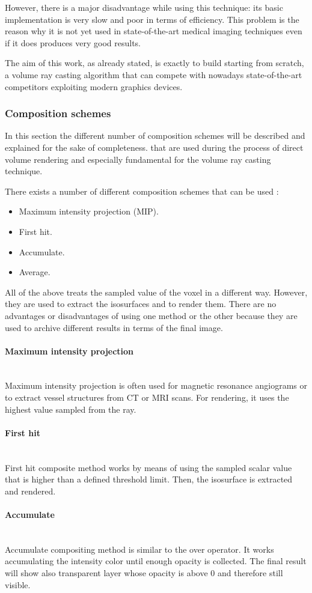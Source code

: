 \documentclass[12pt,a4paper]{extarticle}
\newcommand{\linespace}{\vspace{0pt}}
\newcommand{\myparagraph}[1]{\paragraph{#1}\mbox{}\\}
\begin{document}
However, there is a major disadvantage while using this technique: its basic implementation is very slow and poor in terms of efficiency. This problem is the reason why it is not yet used in state-of-the-art medical imaging techniques even if it does produces very good results.
\linespace

The aim of this work, as already stated, is exactly to build starting from scratch, a volume ray casting algorithm that can compete with nowadays state-of-the-art competitors exploiting modern graphics devices.

\subsubsection{Composition schemes}
In this section the different number of composition schemes will be described and explained for the sake of completeness. that are used during the process of direct volume rendering and especially fundamental for the volume ray casting technique.

There exists a number of different composition schemes that can be used \cite{KAUFMAN2005127}:
\begin{itemize}
\item Maximum intensity projection (MIP).
\item First hit.
\item Accumulate.
\item Average.
\end{itemize}  
All of the above treats the sampled value of the voxel in a different way. However, they are used to extract the isosurfaces and to render them. There are no advantages or disadvantages of using one method or the other because they are used to archive different results in terms of the final image.

\myparagraph{Maximum intensity projection} Maximum intensity projection is often used for magnetic resonance angiograms or to extract vessel structures from CT or MRI scans. For rendering, it uses the highest value sampled from the ray.

\myparagraph{First hit} First hit composite method works by means of using the sampled scalar value that is higher than a defined threshold limit. Then, the isosurface is extracted and rendered.

\myparagraph{Accumulate} Accumulate compositing method is similar to the over operator. It works accumulating the intensity color until enough opacity is collected. The final result will show also transparent layer whose opacity is above 0 and 
therefore still visible.
\end{document}
